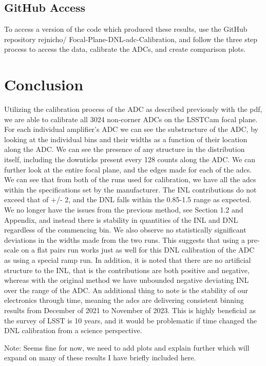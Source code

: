 \documentclass[11pt, letterpaper]{article}
\begin{document}
\subsection{GitHub Access}
\indent 


To access a version of the code which produced these results, use the GitHub repository rejnicho/
Focal-Plane-DNL-adc-Calibration, and follow the three step process to access the data, calibrate the ADCs, and create comparison plots. 

\section{Conclusion}
\indent

Utilizing the calibration process of the ADC as described previously with the pdf, we are able to calibrate all 3024 non-corner ADCs on the LSSTCam focal plane. 
For each individual amplifier’s ADC we can see the substructure of the ADC, by looking at the individual bins and their widths as a function of their location along the ADC. 
We can see the presence of any structure in the distribution itself, including the downticks present every 128 counts along the ADC. 
We can further look at the entire focal plane, and the edges made for each of the adcs. We can see that from both of the runs used for calibration, we have all the adcs within the specifications set by the manufacturer. 
The INL contributions do not exceed that of +/- 2, and the DNL falls within the 0.85-1.5 range as expected. 
We no longer have the issues from the previous method, see Section 1.2 and Appendix, and instead there is stability in quantities of the INL and DNL regardless of the commencing bin. 
We also observe no statistically significant deviations in the widths made from the two runs. 
This suggests that using a pre-scale on a flat pairs run works just as well for this DNL calibration of the ADC as using a special ramp run. 
In addition, it is noted that there are no artificial structure to the INL, that is the contributions are both positive and negative, whereas with the original method we have unbounded negative deviating INL over the range of the ADC. 
An additional thing to note is the stability of our electronics through time, meaning the adcs are delivering consistent binning results from December of 2021 to November of 2023. 
This is highly beneficial as the survey of LSST is 10 years, and it would be problematic if time changed the DNL calibration from a science perspective. 

Note: Seems fine for now, we need to add plots and explain further which will expand on many of these results I have briefly included here. 
\end{document}
